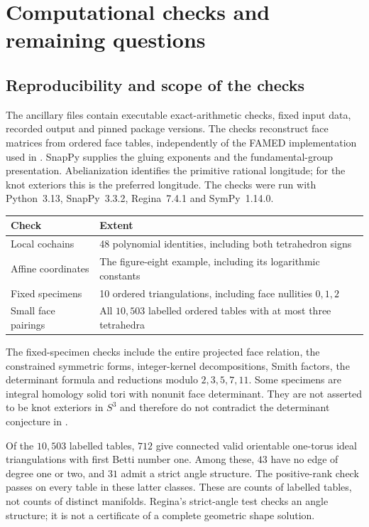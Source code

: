 \documentclass[11pt]{article}
\theoremstyle{definition}\newtheorem{definition}[theorem]{Definition}
\theoremstyle{remark}\newtheorem{remark}[theorem]{Remark}
\begin{document}
\section{Computational checks and remaining questions}\label{sec:checks}
\subsection{Reproducibility and scope of the checks}
The ancillary files contain executable exact-arithmetic checks, fixed input data, recorded output and pinned package versions. The checks reconstruct face matrices from ordered face tables, independently of the FAMED implementation used in \cite{BGW}. SnapPy supplies the gluing exponents and the fundamental-group presentation. Abelianization identifies the primitive rational longitude; for the knot exteriors this is the preferred longitude. The checks were run with Python~3.13, SnapPy~3.3.2, Regina~7.4.1 and SymPy~1.14.0.

\begin{center}
\begin{tabular}{lp{}}
\hline
Check & Extent\\
\hline
Local cochains & 48 polynomial identities, including both tetrahedron signs\\
Affine coordinates & The figure-eight example, including its logarithmic constants\\
Fixed specimens & 10 ordered triangulations, including face nullities $0,1,2$\\
Small face pairings & All $10{,}503$ labelled ordered tables with at most three tetrahedra\\
\hline
\end{tabular}
\end{center}

The fixed-specimen checks include the entire projected face relation, the constrained symmetric forms, integer-kernel decompositions, Smith factors, the determinant formula and reductions modulo $2,3,5,7,11$. Some specimens are integral homology solid tori with nonunit face determinant. They are not asserted to be knot exteriors in $S^3$ and therefore do not contradict the determinant conjecture in \cite{BGW}.

Of the $10{,}503$ labelled tables, $712$ give connected valid orientable one-torus ideal triangulations with first Betti number one. Among these, $43$ have no edge of degree one or two, and $31$ admit a strict angle structure. The positive-rank check passes on every table in these latter classes. These are counts of labelled tables, not counts of distinct manifolds. Regina's strict-angle test checks an angle structure; it is not a certificate of a complete geometric shape solution.
\end{document}
